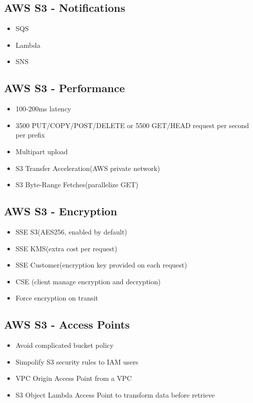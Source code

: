 \documentclass[../../main.tex]{subfiles}
\begin{document}
\subsection{AWS S3 - Notifications}
\begin{itemize}
    \item SQS
    \item Lambda
    \item SNS
\end{itemize}

\subsection{AWS S3 - Performance}
\begin{itemize}
    \item 100-200ms latency
    \item 3500 PUT/COPY/POST/DELETE or 5500 GET/HEAD request per second per prefix
    \item Multipart upload
    \item S3 Transfer Acceleration(AWS private network)
    \item S3 Byte-Range Fetches(parallelize GET)
\end{itemize}

\subsection{AWS S3 - Encryption}
\begin{itemize}
    \item SSE S3(AES256, enabled by default)
    \item SSE KMS(extra cost per request)
    \item SSE Customer(encryption key provided on each request)
    \item CSE (client manage encryption and decryption)
    \item Force encryption on transit
\end{itemize}

\subsection{AWS S3 - Access Points}
\begin{itemize}
    \item Avoid complicated bucket policy
    \item Simpolify S3 security rules to IAM users
    \item VPC Origin Access Point from a VPC
    \item S3 Object Lambda Access Point to transform data before retrieve
\end{itemize}
\end{document}
